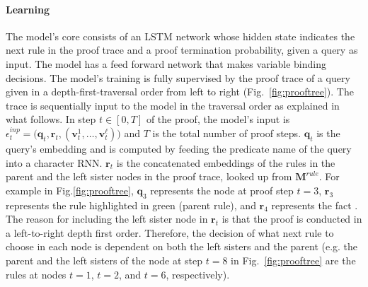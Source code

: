 \paragraph{Learning}
The model's core consists of an LSTM network whose hidden state indicates the next rule in the proof trace and a proof termination probability, given a query as input. The model has a feed forward network that makes variable binding decisions. The model's training is fully supervised by the proof trace of a query given in a depth-first-traversal order from left to right (Fig.~\ref{fig:prooftree}). The trace is sequentially input to the model in the traversal order as explained in what follows. In step $t \in [0,T]$ of the proof, the model's input is $\epsilon^{inp}_t = \big(\mathbf{q}_t, \mathbf{r}_t, (\mathbf{v}^1_t, \dots, \mathbf{v}^\ell_t) \big)$ and $T$ is the total number of proof steps. $\mathbf{q}_t$ is the query's embedding and is computed by feeding the predicate name of the query into a character RNN. $\mathbf{r}_t$ is the concatenated embeddings of the rules in the parent and the left sister nodes in the proof trace, looked up from $\mathbf{M}^{rule}$. For example in Fig.\ref{fig:prooftree}, $\mathbf{q}_3$ represents the node at proof step $t=3$, $\mathbf{r}_3$ represents the rule highlighted in green (parent rule), and $\mathbf{r}_4$ represents the fact . 
The reason for including the left sister node in $\mathbf{r}_t$ is that the proof is conducted in a left-to-right depth first order. Therefore, the decision of what next rule to choose in each node is dependent on both the left sisters and the parent (e.g. the parent and the left sisters of the node at step $t=8$ in Fig.~\ref{fig:prooftree} are the rules at nodes $t=1$, $t=2$, and $t=6$, respectively). 
